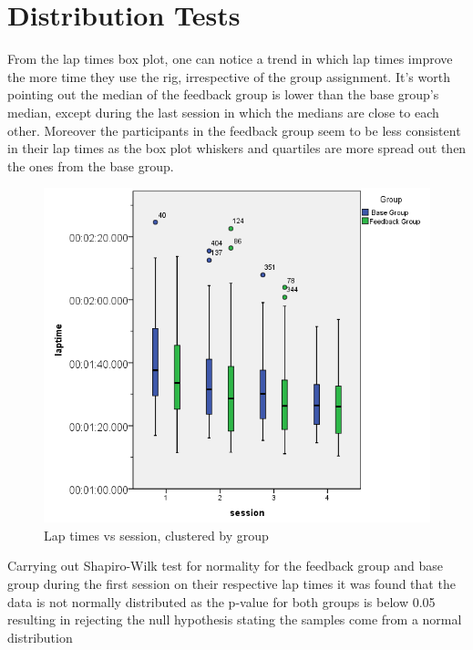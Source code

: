 \section{Distribution Tests}
\label{sec:eval-distTests}

From the lap times box plot, one can notice a trend in which lap times improve the more time they use the rig, irrespective of the group assignment. It's worth pointing out the median of the feedback group is lower than the base group's median, except during the last session in which the medians are close to each other. Moreover the participants in the feedback group seem to be less consistent in their lap times as the box plot whiskers and quartiles are more spread out then the ones from the base group.

\begin{figure}[!htb]
	\centering
	\includegraphics[width=\textwidth]{charts/laptimes.png}
	\caption{Lap times vs session, clustered by group}
	\label{fig:chart-laptimes}
\end{figure}

Carrying out Shapiro-Wilk test for normality for the feedback group and base group during the first session on their respective lap times it was found that the data is not normally distributed as the p-value for both groups is below 0.05 resulting in rejecting the null hypothesis stating the samples come from a normal distribution

